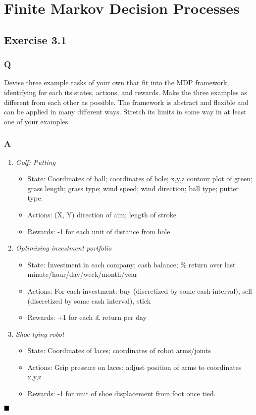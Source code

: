 \section{Finite Markov Decision Processes}
\subsection{Exercise 3.1}
\subsubsection*{Q}
Devise three example tasks of your own that fit into the MDP framework, identifying for each its states, actions, and rewards. Make the three examples as different from each other as possible. The framework is abstract and flexible and can be applied in many different ways. Stretch its limits in some way in at least one of your examples.

\subsubsection*{A}
\begin{enumerate}
	\item \textit{Golf: Putting}
	\begin{itemize}
		\item State: Coordinates of ball; coordinates of hole; x,y,z contour plot of green; grass length; grass type; wind speed; wind direction; ball type; putter type.
		\item Actions: (X, Y) direction of aim; length of stroke
		\item Rewards: -1 for each unit of distance from hole
	\end{itemize}
	\item \textit{Optimizing investment portfolio}
	\begin{itemize}
		\item State: Investment in each company; cash balance; \% return over last minute/hour/day/week/month/year
		\item Actions: For each investment: buy (discretized by some cash interval), sell (discretized by some cash interval), stick
		\item Rewards: +1 for each £ return per day 
	\end{itemize}
	\item \textit{Shoe-tying robot}
	\begin{itemize}
		\item State: Coordinates of laces; coordinates of robot arms/joints
		\item Actions: Grip pressure on laces; adjust position of arms to coordinates x,y,z
		\item Rewards: -1 for unit of shoe displacement from foot once tied.
	\end{itemize}
\end{enumerate}
$
\hfill \blacksquare
$
